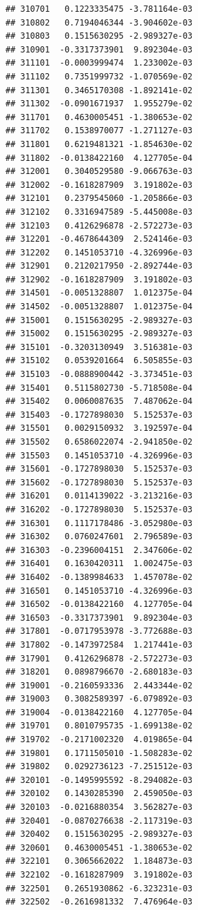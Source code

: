 \documentclass[ignorenonframetext,]{beamer}
\begin{document}
\begin{frame}[fragile]
\begin{verbatim}
## 310701   0.1223335475 -3.781164e-03
## 310802   0.7194046344 -3.904602e-03
## 310803   0.1515630295 -2.989327e-03
## 310901  -0.3317373901  9.892304e-03
## 311101  -0.0003999474  1.233002e-03
## 311102   0.7351999732 -1.070569e-02
## 311301   0.3465170308 -1.892141e-02
## 311302  -0.0901671937  1.955279e-02
## 311701   0.4630005451 -1.380653e-02
## 311702   0.1538970077 -1.271127e-03
## 311801   0.6219481321 -1.854630e-02
## 311802  -0.0138422160  4.127705e-04
## 312001   0.3040529580 -9.066763e-03
## 312002  -0.1618287909  3.191802e-03
## 312101   0.2379545060 -1.205866e-03
## 312102   0.3316947589 -5.445008e-03
## 312103   0.4126296878 -2.572273e-03
## 312201  -0.4678644309  2.524146e-03
## 312202   0.1451053710 -4.326996e-03
## 312901   0.2120217950 -2.892744e-03
## 312902  -0.1618287909  3.191802e-03
## 314501  -0.0051328807  1.012375e-04
## 314502  -0.0051328807  1.012375e-04
## 315001   0.1515630295 -2.989327e-03
## 315002   0.1515630295 -2.989327e-03
## 315101  -0.3203130949  3.516381e-03
## 315102   0.0539201664  6.505855e-03
## 315103  -0.0888900442 -3.373451e-03
## 315401   0.5115802730 -5.718508e-04
## 315402   0.0060087635  7.487062e-04
## 315403  -0.1727898030  5.152537e-03
## 315501   0.0029150932  3.192597e-04
## 315502   0.6586022074 -2.941850e-02
## 315503   0.1451053710 -4.326996e-03
## 315601  -0.1727898030  5.152537e-03
## 315602  -0.1727898030  5.152537e-03
## 316201   0.0114139022 -3.213216e-03
## 316202  -0.1727898030  5.152537e-03
## 316301   0.1117178486 -3.052980e-03
## 316302   0.0760247601  2.796589e-03
## 316303  -0.2396004151  2.347606e-02
## 316401   0.1630420311  1.002475e-03
## 316402  -0.1389984633  1.457078e-02
## 316501   0.1451053710 -4.326996e-03
## 316502  -0.0138422160  4.127705e-04
## 316503  -0.3317373901  9.892304e-03
## 317801  -0.0717953978 -3.772688e-03
## 317802  -0.1473972584  1.217441e-03
## 317901   0.4126296878 -2.572273e-03
## 318201   0.0898796670 -2.680183e-03
## 319001  -0.2160593336  2.443344e-02
## 319003   0.3082589397 -6.079892e-03
## 319004  -0.0138422160  4.127705e-04
## 319701   0.8010795735 -1.699138e-02
## 319702  -0.2171002320  4.019865e-04
## 319801   0.1711505010 -1.508283e-02
## 319802   0.0292736123 -7.251512e-03
## 320101  -0.1495995592 -8.294082e-03
## 320102   0.1430285390  2.459050e-03
## 320103  -0.0216880354  3.562827e-03
## 320401  -0.0870276638 -2.117319e-03
## 320402   0.1515630295 -2.989327e-03
## 320601   0.4630005451 -1.380653e-02
## 322101   0.3065662022  1.184873e-03
## 322102  -0.1618287909  3.191802e-03
## 322501   0.2651930862 -6.323231e-03
## 322502  -0.2616981332  7.476964e-03

\end{verbatim}
\end{frame}
\end{document}
